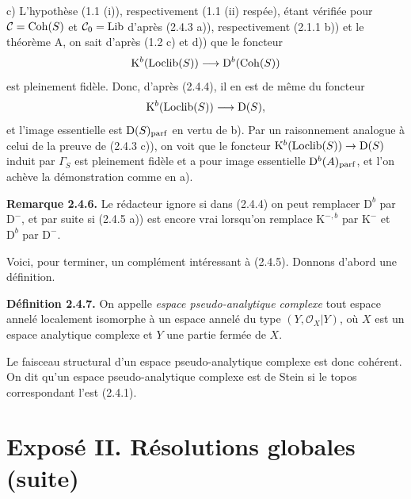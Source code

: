 \documentclass[11pt]{article}
\newcommand{\Spec}{\operatorname{Spec}}
\begin{document}
c) L'hypothèse (1.1 (i)), respectivement (1.1 (ii) respée), étant vérifiée pour $\mathcal C=\Coh(S)$ et $\mathcal C_0=\Lib$ d'après (2.4.3 a)), respectivement (2.1.1 b)) et le théorème A, on sait d'après (1.2 c) et d)) que le foncteur
\[
\mathrm K^b(\Loclib(S))\longrightarrow\mathrm D^b(\Coh(S))
\]
est pleinement fidèle. Donc, d'après (2.4.4), il en est de même du foncteur
\[
\mathrm K^b(\Loclib(S))\longrightarrow\mathrm D(S),
\]
et l'image essentielle est $\mathrm D(S)_{\parf}$ en vertu de b). Par un raisonnement analogue à celui de la preuve de (2.4.3 c)), on voit que le foncteur $\mathrm K^b(\Loclib(S))\to\mathrm D(S)$ induit par $\Gamma_S$ est pleinement fidèle et a pour image essentielle $\mathrm D^b(A)_{\parf}$, et l'on achève la démonstration comme en a).

\textbf{Remarque 2.4.6.} Le rédacteur ignore si dans (2.4.4) on peut remplacer $\mathrm D^b$ par $\mathrm D^{-}$, et par suite si (2.4.5 a)) est encore vrai lorsqu'on remplace $\mathrm K^{-,b}$ par $\mathrm K^{-}$ et $\mathrm D^b$ par $\mathrm D^{-}$.

Voici, pour terminer, un complément intéressant à (2.4.5). Donnons d'abord une définition.

\textbf{Définition 2.4.7.} On appelle \emph{espace pseudo-analytique complexe} tout espace annelé localement isomorphe à un espace annelé du type $(Y,\mathcal O_X|Y)$, où $X$ est un espace analytique complexe et $Y$ une partie fermée de $X$.

Le faisceau structural d'un espace pseudo-analytique complexe est donc cohérent. On dit qu'un espace pseudo-analytique complexe est de Stein si le topos correspondant l'est (2.4.1).



\providecommand{\Qcoh}{\operatorname{Qcoh}}
\providecommand{\Mod}{\operatorname{Mod}}
\providecommand{\Coh}{\operatorname{Coh}}
\providecommand{\Ob}{\operatorname{Ob}}
\providecommand{\Hom}{\operatorname{Hom}}
\providecommand{\Ext}{\operatorname{Ext}}
\providecommand{\Spec}{\operatorname{Spec}}
\providecommand{\qcoh}{\mathrm{qcoh}}
\providecommand{\parf}{\mathrm{parf}}
\providecommand{\coh}{\mathrm{coh}}
\providecommand{\Loclib}{\operatorname{Loclib}}
\providecommand{\Lib}{\operatorname{Lib}}
\providecommand{\im}{\operatorname{Im}}

\section*{Exposé II. Résolutions globales (suite)}
\end{document}
